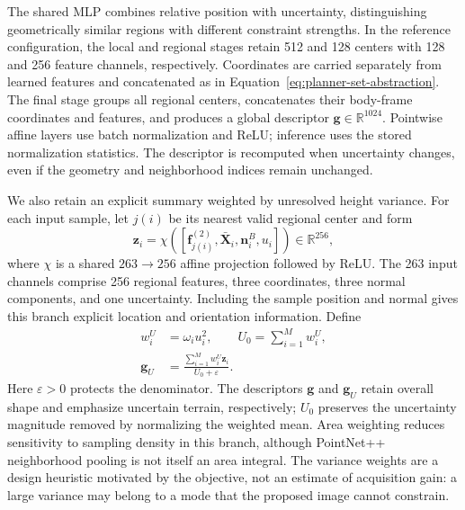 The shared MLP combines relative position with uncertainty, distinguishing geometrically similar regions with different constraint strengths. In the reference configuration, the local and regional stages retain 512 and 128 centers with 128 and 256 feature channels, respectively. Coordinates are carried separately from learned features and concatenated as in Equation~\ref{eq:planner-set-abstraction}. The final stage groups all regional centers, concatenates their body-frame coordinates and features, and produces a global descriptor $\mathbf g\in\mathbb R^{1024}$. Pointwise affine layers use batch normalization and ReLU; inference uses the stored normalization statistics. The descriptor is recomputed when uncertainty changes, even if the geometry and neighborhood indices remain unchanged.

We also retain an explicit summary weighted by unresolved height variance. For each input sample, let $j(i)$ be its nearest valid regional center and form
\begin{equation}
    \mathbf z_i=\chi\!\left(
       [\mathbf f_{j(i)}^{(2)},\bar{\mathbf X}_i,
        \mathbf n_i^B,u_i]\right)\in\mathbb R^{256},
    \label{eq:planner-surface-descriptor}
\end{equation}
where $\chi$ is a shared $263\to256$ affine projection followed by ReLU. The 263 input channels comprise 256 regional features, three coordinates, three normal components, and one uncertainty. Including the sample position and normal gives this branch explicit location and orientation information. Define
\begin{equation}
    \begin{aligned}
        w_i^U&=\omega_i u_i^2,\qquad U_0=\sum_{i=1}^{M}w_i^U,\\
        \mathbf g_U&=\frac{\sum_{i=1}^{M}w_i^U\mathbf z_i}
                              {U_0+\varepsilon}.
    \end{aligned}
    \label{eq:planner-uncertainty-pooling}
\end{equation}
Here $\varepsilon>0$ protects the denominator. The descriptors $\mathbf g$ and $\mathbf g_U$ retain overall shape and emphasize uncertain terrain, respectively; $U_0$ preserves the uncertainty magnitude removed by normalizing the weighted mean. Area weighting reduces sensitivity to sampling density in this branch, although PointNet++ neighborhood pooling is not itself an area integral. The variance weights are a design heuristic motivated by the objective, not an estimate of acquisition gain: a large variance may belong to a mode that the proposed image cannot constrain.


